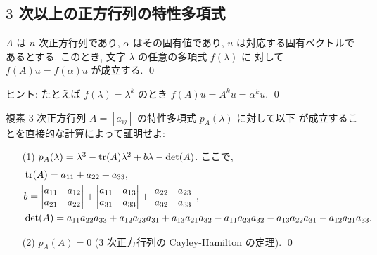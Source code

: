 \documentclass[12pt,twoside]{jarticle}
\begin{document}

\subsection{$3$ 次以上の正方行列の特性多項式}
\label{sec:char-polyn}


\begin{question}[5点]
  $A$ は $n$ 次正方行列であり, $\alpha$ はその固有値であり, 
  $u$ は対応する固有ベクトルであるとする. 
  このとき, 文字 $\lambda$ の任意の多項式 $f(\lambda)$ に
  対して $f(A)u=f(\alpha)u$ が成立する. 
  \qed
\end{question}

\noindent 
ヒント: たとえば $f(\lambda)=\lambda^k$ のとき $f(A)u = A^k u = \alpha^k u$.
\qed


\begin{question}[8点]
  \label{q:char-poly-3.1}
  複素 $3$ 次正方行列 $A=[a_{ij}]$ の特性多項式 $p_A(\lambda)$ に対して以下
  が成立することを直接的な計算によって証明せよ: 
  \begin{enumerate}
  \item[(1)] 
    $p_A(\lambda) = \lambda^3 - \mathop{\mathrm{tr}}\nolimits(A)\lambda^2 + b\lambda - \det(A)$.
    ここで,
    \begin{align*}
      &
      \mathop{\mathrm{tr}}\nolimits(A) = a_{11} + a_{22} + a_{33}, 
      \\ &
      b = 
      \begin{vmatrix}
        a_{11} & a_{12} \\
        a_{21} & a_{22} \\
      \end{vmatrix}
      +
      \begin{vmatrix}
        a_{11} & a_{13} \\
        a_{31} & a_{33} \\
      \end{vmatrix}
      +
      \begin{vmatrix}
        a_{22} & a_{23} \\
        a_{32} & a_{33} \\
      \end{vmatrix},
      \\ &
      \det(A) =
        a_{11}a_{22}a_{33}
      + a_{12}a_{23}a_{31}
      + a_{13}a_{21}a_{32}
      - a_{11}a_{23}a_{32}
      - a_{13}a_{22}a_{31}
      - a_{12}a_{21}a_{33}.
    \end{align*}
  \item[(2)] \( p_A(A) = 0 \) \quad ($3$ 次正方行列の Cayley-Hamilton の定理).
  \qed
  \end{enumerate}
\end{question}
\end{document}
